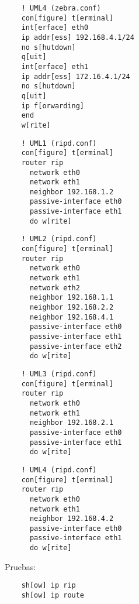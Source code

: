   \begin{verbatim}
    ! UML4 (zebra.conf)
    con[figure] t[erminal]
    int[erface] eth0
    ip addr[ess] 192.168.4.1/24
    no s[hutdown]
    q[uit]
    int[erface] eth1
    ip addr[ess] 172.16.4.1/24
    no s[hutdown]
    q[uit]
    ip f[orwarding]
    end
    w[rite]
  \end{verbatim}
  
  \begin{verbatim}
    ! UML1 (ripd.conf)
    con[figure] t[erminal]
    router rip
      network eth0
      network eth1
      neighbor 192.168.1.2
      passive-interface eth0
      passive-interface eth1
      do w[rite]
  \end{verbatim}
  
  \begin{verbatim}
    ! UML2 (ripd.conf)
    con[figure] t[erminal]
    router rip
      network eth0
      network eth1
      network eth2
      neighbor 192.168.1.1
      neighbor 192.168.2.2
      neighbor 192.168.4.1
      passive-interface eth0
      passive-interface eth1
      passive-interface eth2
      do w[rite]
  \end{verbatim}
  
  \begin{verbatim}
    ! UML3 (ripd.conf)
    con[figure] t[erminal]
    router rip
      network eth0
      network eth1
      neighbor 192.168.2.1
      passive-interface eth0
      passive-interface eth1
      do w[rite]
  \end{verbatim}
  
  \begin{verbatim}
    ! UML4 (ripd.conf)
    con[figure] t[erminal]
    router rip
      network eth0
      network eth1
      neighbor 192.168.4.2
      passive-interface eth0
      passive-interface eth1
      do w[rite]
  \end{verbatim}
  
  Pruebas:
  \begin{verbatim}
    sh[ow] ip rip
    sh[ow] ip route
  \end{verbatim}